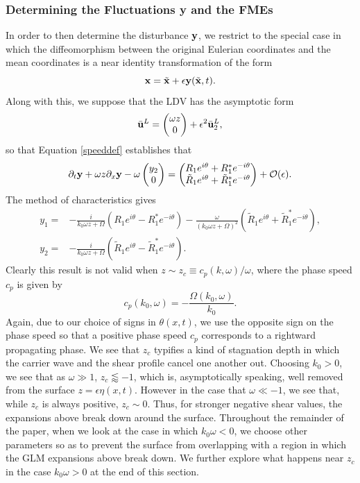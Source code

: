 \documentclass{JFM_Style/jfm}
\newcommand{\bp}{\begin{pmatrix}}
\newcommand{\ep}{\end{pmatrix}}
\newcommand{\pd}{\partial}
\begin{document}
\subsubsection*{Determining the Fluctuations {\bf y} and the FMEs} 
In order to then determine the disturbance ${\bf y}$, we restrict to the special case in which the diffeomorphism between the original Eulerian coordinates and the mean coordinates is a near identity transformation of the form 
\[
{\bf x} = \tilde{{\bf x}} + \epsilon{\bf y}(\tilde{{\bf x}},t).
\]
Along with this, we suppose that the LDV has the asymptotic form
\[
\bar{{\bf u}}^{L} = \bp \omega z \\ 0 \ep + \epsilon^{2}\bar{{\bf u}}^{L}_{2}, 
\]
so that Equation \eqref{speeddef} establishes that
\begin{equation}
\pd_{t}{\bf y} + \omega z \pd_{x}{\bf y} - \omega \bp y_{2}\\ 0 \ep = \bp R_{1}e^{i\theta}+R^{\ast}_{1}e^{-i\theta}\\ \tilde{R}_{1}e^{i\theta}+\tilde{R}^{\ast}_{1}e^{-i\theta} \ep + \mathcal{O}(\epsilon).
\label{vareqn}
\end{equation}
The method of characteristics gives
\begin{align}
y_{1} = & - \frac{i}{k_{0}\omega z + \Omega}\left(R_{1}e^{i\theta} -R^{\ast}_{1}e^{-i\theta} \right) - \frac{\omega}{(k_{0}\omega z + \Omega)^{2}}\left(\tilde{R}_{1}e^{i\theta} + \tilde{R}^{\ast}_{1}e^{-i\theta} \right),\label{meanfc1}\\
y_{2} = & - \frac{i}{k_{0}\omega z + \Omega}\left(\tilde{R}_{1}e^{i\theta} -\tilde{R}^{\ast}_{1}e^{-i\theta} \right) \label{meanfc2}.
\end{align}
Clearly this result is not valid when $z\sim z_{c} \equiv c_{p}(k,\omega)/\omega$, where the phase speed $c_{p}$ is given by
\[
c_{p}(k_{0},\omega) = -\frac{\Omega(k_{0},\omega)}{k_{0}}.
\]
Again, due to our choice of signs in $\theta(x,t)$, we use the opposite sign on the phase speed so that a positive phase speed $c_{p}$ corresponds to a rightward propagating phase.   We see that $z_{c}$ typifies a kind of stagnation depth in which the carrier wave and the shear profile cancel one another out.  Choosing $k_{0}>0$, we see that as $\omega \gg 1$, $z_{c}\lessapprox -1$, which is, asymptotically speaking, well removed from the surface $z=\epsilon \eta(x,t)$.  However in the case that $\omega \ll -1$, we see that, while $z_{c}$ is always positive, $z_{c}\sim 0$.  Thus, for stronger negative shear values, the expansions above break down around the surface.    Throughout the remainder of the paper, when we look at the case in which $k_{0}\omega <0$, we choose other parameters so as to prevent the surface from overlapping with a region in which the GLM expansions above break down. We further explore what happens near $z_{c}$ in the case $k_{0}\omega >0$ at the end of this section.
\end{document}

